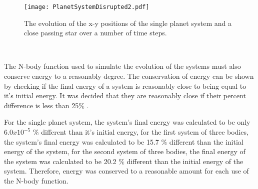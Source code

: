 \documentclass{article}
\begin{document}
\begin{figure}[H]
    \centering
    \texttt{[image: PlanetSystemDisrupted2.pdf]}
    \caption{The evolution of the x-y positions of the single planet system and a close passing star over a number of time steps.}
    \label{fig:3}
\end{figure}
\\
\text\par{The N-body function used to simulate the evolution of the systems must also conserve energy to a reasonably degree. The conservation of energy can be shown by checking if the final energy of a system is reasonably close to being equal to it's initial energy. It was decided that they are reasonably close if their percent difference is less than 25\% . 
\\
\par{For the single planet system, the system's final energy was calculated to be only ${6.0x10^{-5} }$ \%  different than it's initial energy, for the first system of three bodies, the system's final energy was calculated to be 15.7 \% different than the initial energy of the system, for the second system of three bodies, the final energy of the system was calculated to be 20.2 \%  different than the initial energy of the system. Therefore, energy was conserved to a reasonable amount for each use of the N-body function.} }
\end{document}
